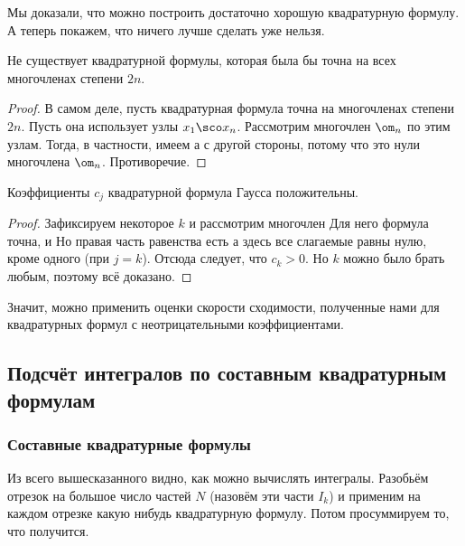 \documentclass[a4paper]{article}
\begin{document}
Мы доказали, что можно построить достаточно хорошую квадратурную
формулу.  А теперь покажем, что ничего лучше сделать уже нельзя.

\begin{stm}
Не существует квадратурной формулы, которая была бы точна на всех
многочленах степени $2n$.
\end{stm}
\begin{proof}
В самом деле, пусть квадратурная формула точна на многочленах степени
$2n$.  Пусть она использует узлы $x_1\sco x_n$. Рассмотрим многочлен
$\om_n$ по этим узлам.  Тогда, в частности, имеем  а с другой стороны,  потому что это нули многочлена
$\om_n$. Противоречие.
\end{proof}

\begin{stm}
Коэффициенты $c_j$ квадратурной формула Гаусса положительны.
\end{stm}
\begin{proof}
Зафиксируем некоторое $k$ и рассмотрим многочлен   Для него формула точна, и   Но
правая часть равенства есть  а здесь все слагаемые равны нулю,
кроме одного (при $j = k$).  Отсюда следует, что $c_k > 0$. Но $k$
можно было брать любым, поэтому всё доказано.
\end{proof}

Значит, можно применить оценки скорости сходимости, полученные нами
для квадратурных формул с неотрицательными коэффициентами.

\subsection{Подсчёт интегралов по составным квадратурным формулам}

\subsubsection{Составные квадратурные формулы}

Из всего вышесказанного видно, как можно вычислять интегралы. Разобьём
отрезок на большое число частей $N$ (назовём эти части $I_k$) и
применим на каждом отрезке какую нибудь квадратурную формулу.  Потом
просуммируем то, что получится.
\end{document}
